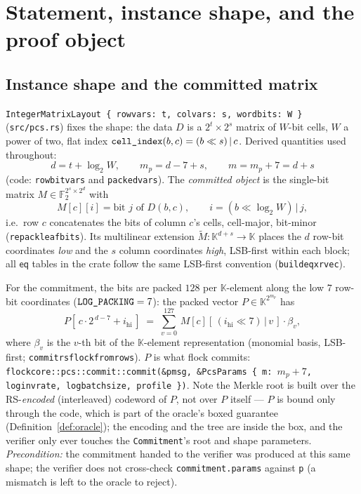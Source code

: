 \documentclass[11pt]{article}
\newcommand{\F}{\mathbb{F}}
\newcommand{\K}{\mathbb{K}}            %
\newcommand{\Ftwo}{\F_2}
\newcommand{\mle}[1]{\widetilde{#1}}
\newcommand{\eq}{\mathsf{eq}}
\newcommand{\code}[1]{{\def\_{\textunderscore\allowbreak}\texttt{#1}}}
\begin{document}
\section{Statement, instance shape, and the proof object}
\label{sec:statement}

\subsection{Instance shape and the committed matrix}

\code{IntegerMatrixLayout \{ row\_vars: t, col\_vars: s, word\_bits: W \}} (\code{src/pcs.rs}) fixes
the shape: the data $D$ is a $2^t \times 2^s$ matrix of $W$-bit cells,
$W$ a power of two, flat index $\code{cell\_index}(b,c) = (b \ll s)\,|\,c$.
Derived quantities used throughout:
\[
  d = t + \log_2 W, \qquad
  m_p = d - 7 + s, \qquad
  m = m_p + 7 = d + s
\]
(code: \code{row\_bit\_vars} and \code{packed\_vars}).
The \emph{committed object} is the single-bit matrix
$M \in \Ftwo^{2^s \times 2^d}$ with
\[
  M[c][i] = \text{bit } j \text{ of } D(b,c), \qquad
  i = (b \ll \log_2 W)\,|\,j ,
\]
i.e.\ row $c$ concatenates the bits of column $c$'s cells, cell-major,
bit-minor (\code{repack\_leaf\_bits}).  Its multilinear extension
$\mle{M} \colon \K^{d+s} \to \K$ places the $d$ row-bit coordinates
\emph{low} and the $s$ column coordinates \emph{high}, LSB-first within
each block; all $\eq$ tables in the crate follow the same LSB-first
convention (\code{build\_eq\_x\_r\_vec}).

For the commitment, the bits are packed $128$ per $\K$-element along the
low $7$ row-bit coordinates ($\code{LOG\_PACKING} = 7$): the packed vector
$P \in \K^{2^{m_p}}$ has
\[
  P[\,c \cdot 2^{\,d-7} + i_{\mathrm{hi}}\,]
  \;=\; \textstyle\sum_{v=0}^{127}\, M[c][\,(i_{\mathrm{hi}} \ll 7)\,|\,v\,]\cdot \beta_v ,
\]
where $\beta_v$ is the $v$-th bit of the $\K$-element representation
(monomial basis, LSB-first; \code{commit\_rs\_flock\_from\_rows}).  $P$ is
what flock commits: \code{flock\_core::pcs::commit::commit(\&p\_msg, \&PcsParams
\{ m: $m_p + 7$, log\_inv\_rate, log\_batch\_size, profile \})}.  Note the
Merkle root is built over the RS-\emph{encoded} (interleaved) codeword of
$P$, not over $P$ itself — $P$ is bound only through the code, which is
part of the oracle's boxed guarantee (Definition~\ref{def:oracle}); the
encoding and the tree are inside the box, and the verifier only ever
touches the \code{Commitment}'s root and shape parameters.  \emph{Precondition:} the commitment handed to the verifier
was produced at this same shape; the verifier does not cross-check
\code{commitment.params} against \code{p} (a mismatch is left to the
oracle to reject).
\end{document}
